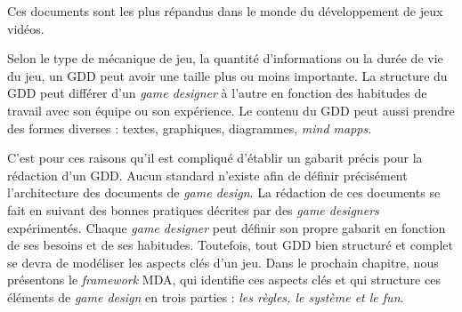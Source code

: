 %  
Ces documents sont les plus répandus dans le monde du développement de jeux vidéos. 

Selon le type de mécanique de jeu, la quantité d'informations ou la durée de vie du jeu, un GDD peut avoir une taille plus ou moins importante. 
%
La structure du GDD peut différer d'un \emph{game designer} à l'autre en fonction des habitudes de travail avec son équipe ou son expérience.
Le contenu du GDD peut aussi prendre des formes diverses :  textes,  graphiques, diagrammes,  \emph{mind mapps}. 



C'est pour ces raisons qu'il est compliqué d'établir un gabarit précis pour la rédaction d'un GDD.
Aucun standard n'existe afin de définir précisément l'architecture des documents de \emph{game design}.
La rédaction de ces documents se fait en suivant des bonnes pratiques décrites par des \emph{game designers} expérimentés.
Chaque \emph{game designer} peut définir son propre gabarit en fonction de ses besoins et de ses habitudes.
%
%
Toutefois, tout GDD bien structuré et complet se devra de modéliser les aspects clés d'un jeu. 
Dans le prochain chapitre, nous présentons le \emph{framework} MDA, qui identifie ces aspects clés et qui structure ces éléments de \emph{game design} en trois parties : \emph{les règles, le système et le fun}.
